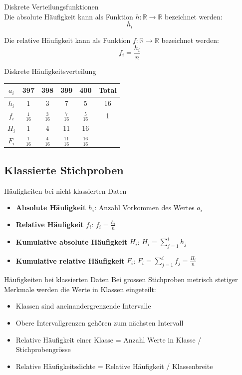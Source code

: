 \begin{definition}{Diskrete Verteilungsfunktionen}\\
Die absolute Häufigkeit kann als Funktion $h: \mathbb{R} \rightarrow \mathbb{R}$ bezeichnet werden:
$$h_i$$

Die relative Häufigkeit kann als Funktion $f: \mathbb{R} \rightarrow \mathbb{R}$ bezeichnet werden:
$$f_i = \frac{h_i}{n}$$
\end{definition}

\begin{example2}{Diskrete Häufigkeitsverteilung}\\
\renewcommand{\arraystretch}{2}%
\begin{center}
\begin{tabular}{|c|c|c|c|c|c|}
\hline
$a_i$ & 397 & 398 & 399 & 400 & Total \\
\hline
$h_i$ & 1 & 3 & 7 & 5 & 16 \\
\hline
$f_i$ & $\frac{1}{16}$ & $\frac{3}{16}$ & $\frac{7}{16}$ & $\frac{5}{16}$ & 1 \\
\hline
$H_i$ & 1 & 4 & 11 & 16 & \\
\hline
$F_i$ & $\frac{1}{16}$ & $\frac{4}{16}$ & $\frac{11}{16}$ & $\frac{16}{16}$ & \\
\hline
\end{tabular}
\end{center}
\end{example2}

\subsection{Klassierte Stichproben}


\begin{definition}{Häufigkeiten bei nicht-klassierten Daten}
\begin{itemize}
    \item \textbf{Absolute Häufigkeit} $h_i$: Anzahl Vorkommen des Wertes $a_i$
    \item \textbf{Relative Häufigkeit} $f_i$: $f_i = \frac{h_i}{n}$
    \item \textbf{Kumulative absolute Häufigkeit} $H_i$: $H_i = \sum_{j=1}^i h_j$
    \item \textbf{Kumulative relative Häufigkeit} $F_i$: $F_i = \sum_{j=1}^i f_j = \frac{H_i}{n}$
\end{itemize}
\end{definition}

\begin{definition}{Häufigkeiten bei klassierten Daten}
Bei grossen Stichproben metrisch stetiger Merkmale werden die Werte in Klassen eingeteilt:
\begin{itemize}
    \item Klassen sind aneinandergrenzende Intervalle
    \item Obere Intervallgrenzen gehören zum nächsten Intervall
    \item Relative Häufigkeit einer Klasse = Anzahl Werte in Klasse / Stichprobengrösse
    \item Relative Häufigkeitsdichte = Relative Häufigkeit / Klassenbreite
\end{itemize}
\end{definition}


